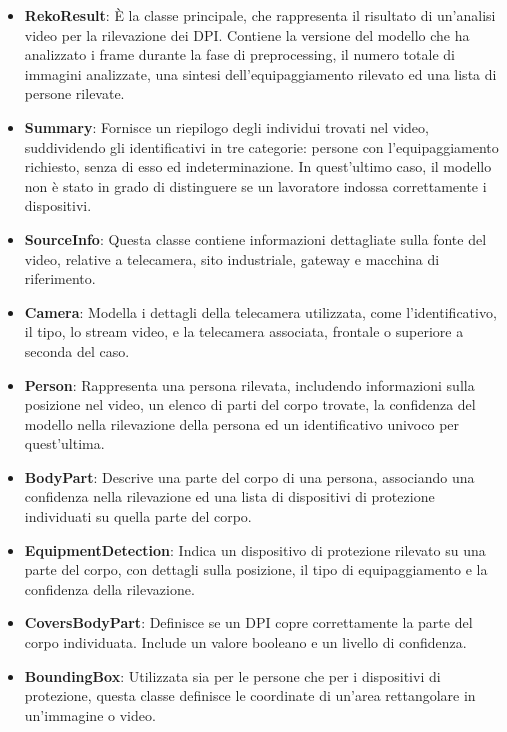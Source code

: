 \begin{itemize}
	\item \textbf{RekoResult}: È la classe principale, che rappresenta il risultato di un'analisi video per la rilevazione dei DPI. Contiene la versione del modello che ha analizzato i frame durante la fase di preprocessing, il numero totale di immagini analizzate, una sintesi dell'equipaggiamento rilevato ed una lista di persone rilevate.
	\item \textbf{Summary}: Fornisce un riepilogo degli individui trovati nel video, suddividendo gli identificativi in tre categorie: persone con l'equipaggiamento richiesto, senza di esso ed indeterminazione. In quest'ultimo caso, il modello non è stato in grado di distinguere se un lavoratore indossa correttamente i dispositivi.
	\item \textbf{SourceInfo}: Questa classe contiene informazioni dettagliate sulla fonte del video, relative a telecamera, sito industriale, gateway e macchina di riferimento.
	\item \textbf{Camera}: Modella i dettagli della telecamera utilizzata, come l'identificativo, il tipo, lo stream video, e la telecamera associata, frontale o superiore a seconda del caso.
	\item \textbf{Person}: Rappresenta una persona rilevata, includendo informazioni sulla posizione nel video, un elenco di parti del corpo trovate, la confidenza del modello nella rilevazione della persona ed un identificativo univoco per quest'ultima.
	\item \textbf{BodyPart}: Descrive una parte del corpo di una persona, associando una confidenza nella rilevazione ed una lista di dispositivi di protezione individuati su quella parte del corpo.
	\item \textbf{EquipmentDetection}: Indica un dispositivo di protezione rilevato su una parte del corpo, con dettagli sulla posizione, il tipo di equipaggiamento e la confidenza della rilevazione.
	\item \textbf{CoversBodyPart}: Definisce se un DPI copre correttamente la parte del corpo individuata. Include un valore booleano e un livello di confidenza.
	\item \textbf{BoundingBox}: Utilizzata sia per le persone che per i dispositivi di protezione, questa classe definisce le coordinate di un'area rettangolare in un'immagine o video.
\end{itemize}

